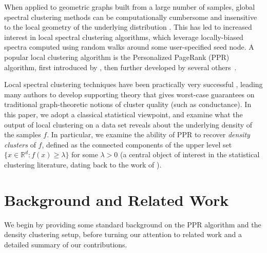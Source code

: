 \documentclass[11pt,twoside]{article}
\newcommand{\Reals}{\mathbb{R}}
\newcommand{\Rd}{\Reals^d}
\newcommand{\1}{\mathbf{1}}
\begin{document}

When applied to geometric graphs built from a large number of samples,
global spectral clustering methods can be computationally cumbersome and   
insensitive to the local geometry of the underlying distribution
\citep{leskovec2010,mahoney2012}.  This has led to increased interest in
local spectral clustering algorithms, which leverage locally-biased spectra
computed using random walks around some user-specified seed node.  A popular 
local clustering algorithm is the Personalized PageRank (PPR) algorithm, first introduced by 
\citet{haveliwala2003}, then further developed by
several others~\citep{spielman2011,spielman2014,andersen2006,mahoney2012,zhu2013}.

Local spectral clustering techniques have been practically very successful
\citep{leskovec2010,andersen2012,gleich2012,mahoney2012,wu2012}, leading 
many authors to develop supporting theory
\citep{spielman2013,andersen2009,gharan2012,zhu2013} that gives worst-case
guarantees on traditional graph-theoretic notions of cluster quality (such as
conductance).  In this paper, we adopt a classical statistical viewpoint,
and examine what the output of local clustering on a data set reveals about the
underlying density of the samples 
$f$.  In particular, we examine the ability of PPR to recover
\emph{density clusters} of $f$, defined as the connected components of
the upper level set $\{x \in \Rd : f(x) \geq \lambda\}$ for some $\lambda > 0$
(a central object of interest in the statistical clustering literature, dating
back to the work of \citet{hartigan1981}).   

\section{Background and Related Work}
We begin by providing some standard background on the PPR algorithm
and the density clustering setup, before turning our attention to related work
and a
detailed summary of our contributions.
\end{document}
